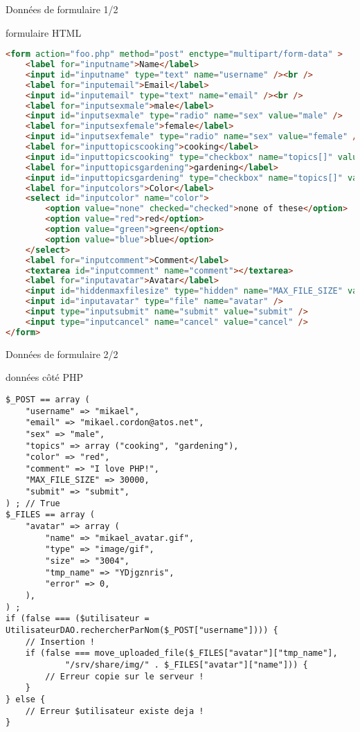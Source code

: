 \begin{frame}[containsverbatim]{Données de formulaire 1/2}
	\begin{block}{formulaire HTML}
		\begin{lstlisting}[language=html]
<form action="foo.php" method="post" enctype="multipart/form-data" >
    <label for="inputname">Name</label>
	<input id="inputname" type="text" name="username" /><br />
    <label for="inputemail">Email</label>
	<input id="inputemail" type="text" name="email" /><br />
	<label for="inputsexmale">male</label>
	<input id="inputsexmale" type="radio" name="sex" value="male" />
	<label for="inputsexfemale">female</label>
	<input id="inputsexfemale" type="radio" name="sex" value="female" />
	<label for="inputtopicscooking">cooking</label>
	<input id="inputtopicscooking" type="checkbox" name="topics[]" value="cooking" />
	<label for="inputtopicsgardening">gardening</label>
	<input id="inputtopicsgardening" type="checkbox" name="topics[]" value="gardening" />
	<label for="inputcolors">Color</label>
	<select id="inputcolor" name="color">
		<option value="none" checked="checked">none of these</option>
		<option value="red">red</option>
		<option value="green">green</option>
		<option value="blue">blue</option>
	</select>
	<label for="inputcomment">Comment</label>
	<textarea id="inputcomment" name="comment"></textarea>
	<label for="inputavatar">Avatar</label>
	<input id="hiddenmaxfilesize" type="hidden" name="MAX_FILE_SIZE" value="30000" />
	<input id="inputavatar" type="file" name="avatar" />
    <input type="inputsubmit" name="submit" value="submit" />
    <input type="inputcancel" name="cancel" value="cancel" />
</form>
		\end{lstlisting}
	\end{block}
\end{frame}

\begin{frame}[containsverbatim]{Données de formulaire 2/2}
	\begin{block}{données côté PHP}
		\begin{lstlisting}
$_POST == array (
	"username" => "mikael",
	"email" => "mikael.cordon@atos.net",
	"sex" => "male",
	"topics" => array ("cooking", "gardening"),
	"color" => "red",
	"comment" => "I love PHP!",
	"MAX_FILE_SIZE" => 30000,
	"submit" => "submit",
) ; // True
$_FILES == array (
	"avatar" => array (
		"name" => "mikael_avatar.gif",
		"type" => "image/gif",
		"size" => "3004",
		"tmp_name" => "YDjgznris",
		"error" => 0,
	),
) ;
if (false === ($utilisateur = UtilisateurDAO.rechercherParNom($_POST["username"]))) {
	// Insertion !
	if (false === move_uploaded_file($_FILES["avatar"]["tmp_name"], 
			"/srv/share/img/" . $_FILES["avatar"]["name"])) {
		// Erreur copie sur le serveur !
	}
} else {
	// Erreur $utilisateur existe deja !
}
		\end{lstlisting}
	\end{block}
\end{frame}
